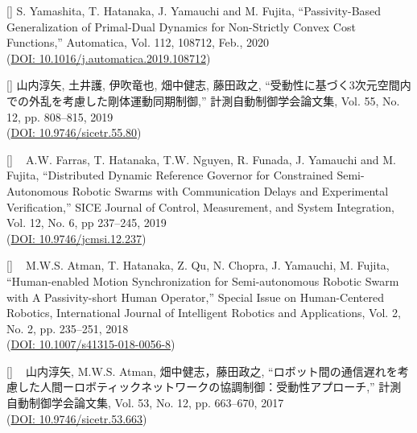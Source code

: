 \documentclass[letterpaper]{article}
\newcounter{trans}
\begin{document}
[]  
  S. Yamashita, T. Hatanaka, J. Yamauchi and M. Fujita,
  ``Passivity-Based Generalization of Primal-Dual Dynamics for Non-Strictly Convex Cost Functions,''
  Automatica, Vol. 112, 108712, Feb., 2020 \\ 
  (\href{https://www.sciencedirect.com/science/article/pii/S0005109819305758}{DOI: 10.1016/j.automatica.2019.108712}) \\
\addtocounter{trans}{-1}

[]  
  山内淳矢, 土井護, 伊吹竜也, 畑中健志, 藤田政之, 
  ``受動性に基づく3次元空間内での外乱を考慮した剛体運動同期制御,'' 
  計測自動制御学会論文集, Vol. 55, No. 12, pp. 808--815, 2019 \\ 
  (\href{https://www.jstage.jst.go.jp/article/sicetr/55/12/55_808/_article/-char/ja/}{DOI: 10.9746/sicetr.55.80}) \\
\addtocounter{trans}{-1}

[] ~ 
  A.W. Farras, T. Hatanaka, T.W. Nguyen, R. Funada, J. Yamauchi and M. Fujita, 
  ``Distributed Dynamic Reference Governor for Constrained Semi-Autonomous Robotic Swarms with Communication Delays and Experimental Verification,''
  SICE Journal of Control, Measurement, and System Integration, Vol. 12, No. 6, pp 237--245, 2019 \\ 
  (\href{https://www.jstage.jst.go.jp/article/jcmsi/12/6/12_237/_article/-char/en}{DOI: 10.9746/jcmsi.12.237}) \\
\addtocounter{trans}{-1}

[] ~ 
  M.W.S. Atman, T. Hatanaka, Z. Qu, N. Chopra, J. Yamauchi, M. Fujita,
  ``Human-enabled Motion Synchronization for Semi-autonomous Robotic Swarm with A Passivity-short Human Operator,''
  Special Issue on Human-Centered Robotics, International Journal of Intelligent Robotics and Applications, Vol. 2, No. 2, pp. 235--251, 2018 \\
  (\href{https://doi.org/10.1007/s41315-018-0056-8}{DOI: 10.1007/s41315-018-0056-8}) \\
\addtocounter{trans}{-1}

[] ~ 山内淳矢, M.W.S. Atman, 畑中健志，藤田政之,
  ``ロボット間の通信遅れを考慮した人間ーロボティックネットワークの協調制御：受動性アプローチ,''
  計測自動制御学会論文集, Vol. 53, No. 12, pp. 663--670, 2017 \\
  (\href{https://doi.org/10.9746/sicetr.53.663}{DOI: 10.9746/sicetr.53.663}) \\
\addtocounter{trans}{-1}
\end{document}
